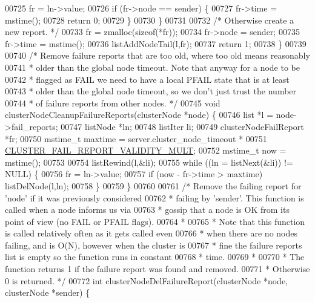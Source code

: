 \begin{DoxyCode}
{{{{{{{{{{{00725         fr = ln->value;
00726         \textcolor{keywordflow}{if} (fr->node == sender) \{
00727             fr->time = mstime();
00728             \textcolor{keywordflow}{return} 0;
00729         \}
00730     \}
00731 
00732     \textcolor{comment}{/* Otherwise create a new report. */}
00733     fr = zmalloc(\textcolor{keyword}{sizeof}(*fr));
00734     fr->node = sender;
00735     fr->time = mstime();
00736     listAddNodeTail(l,fr);
00737     \textcolor{keywordflow}{return} 1;
00738 \}
00739 
00740 \textcolor{comment}{/* Remove failure reports that are too old, where too old means reasonably}
00741 \textcolor{comment}{ * older than the global node timeout. Note that anyway for a node to be}
00742 \textcolor{comment}{ * flagged as FAIL we need to have a local PFAIL state that is at least}
00743 \textcolor{comment}{ * older than the global node timeout, so we don't just trust the number}
00744 \textcolor{comment}{ * of failure reports from other nodes. */}
00745 \textcolor{keywordtype}{void} clusterNodeCleanupFailureReports(clusterNode *node) \{
00746     list *l = node->fail\_reports;
00747     listNode *ln;
00748     listIter li;
00749     clusterNodeFailReport *fr;
00750     mstime\_t maxtime = server.cluster\_node\_timeout *
00751                      \hyperlink{cluster_8h_a6679b8ca82e8f5b657759a896fa9c1ac}{CLUSTER\_FAIL\_REPORT\_VALIDITY\_MULT};
00752     mstime\_t now = mstime();
00753 
00754     listRewind(l,&li);
00755     \textcolor{keywordflow}{while} ((ln = listNext(&li)) != NULL) \{
00756         fr = ln->value;
00757         \textcolor{keywordflow}{if} (now - fr->time > maxtime) listDelNode(l,ln);
00758     \}
00759 \}
00760 
00761 \textcolor{comment}{/* Remove the failing report for 'node' if it was previously considered}
00762 \textcolor{comment}{ * failing by 'sender'. This function is called when a node informs us via}
00763 \textcolor{comment}{ * gossip that a node is OK from its point of view (no FAIL or PFAIL flags).}
00764 \textcolor{comment}{ *}
00765 \textcolor{comment}{ * Note that this function is called relatively often as it gets called even}
00766 \textcolor{comment}{ * when there are no nodes failing, and is O(N), however when the cluster is}
00767 \textcolor{comment}{ * fine the failure reports list is empty so the function runs in constant}
00768 \textcolor{comment}{ * time.}
00769 \textcolor{comment}{ *}
00770 \textcolor{comment}{ * The function returns 1 if the failure report was found and removed.}
00771 \textcolor{comment}{ * Otherwise 0 is returned. */}
00772 \textcolor{keywordtype}{int} clusterNodeDelFailureReport(clusterNode *node, clusterNode *sender) \{
}}}}}}}}}}}
\end{DoxyCode}
